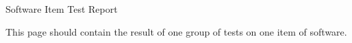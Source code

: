 \setlength{\textwidth}{154mm}
\setlength{\headsep}{0mm}
\setlength{\headheight}{0mm}
\setlength{\textheight}{250mm}
\setlength{\oddsidemargin}{2.6mm}
\setlength{\evensidemargin}{2.6mm}
\setlength{\topmargin}{2.0mm}
\samepage

\begin{center}
\begin{bf}
\begin{Large}

Software Item Test Report                                          

\end{Large}
\end{bf}
\end{center}
\begin{scriptsize}
\begin{it}
This page should contain the result of one group of tests on one item of software.
\end{it}
\end{scriptsize}
